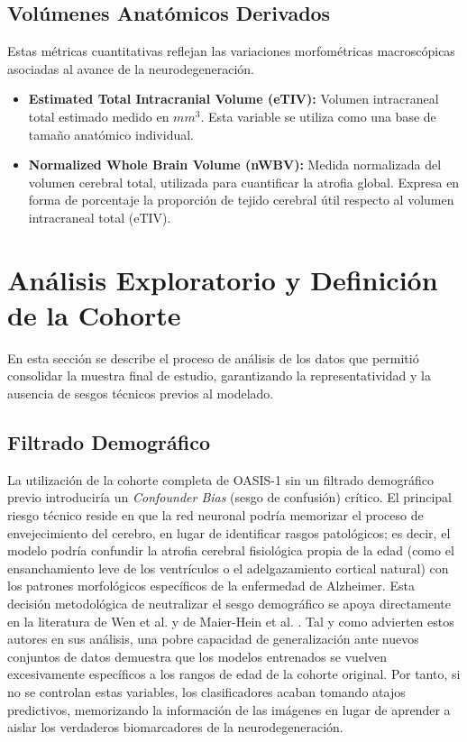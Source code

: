 \documentclass[12pt, oneside, english, spanish]{book}
\begin{document}
\subsection{Volúmenes Anatómicos Derivados} \label{subsec:volumenes_anatomicos}
Estas métricas cuantitativas reflejan las variaciones morfométricas macroscópicas asociadas al avance de la neurodegeneración.
\begin{itemize}
	\item \textbf{Estimated Total Intracranial Volume (eTIV):} Volumen intracraneal total estimado medido en $mm^3$. Esta variable se utiliza como una base de tamaño anatómico individual.
	
	\item \textbf{Normalized Whole Brain Volume (nWBV):} Medida normalizada del volumen cerebral total, utilizada para cuantificar la atrofia global. Expresa en forma de porcentaje la proporción de tejido cerebral útil respecto al volumen intracraneal total (eTIV).
\end{itemize}

\section{Análisis Exploratorio y Definición de la Cohorte} \label{sec:eda}

En esta sección se describe el proceso de análisis de los datos que permitió consolidar la muestra final de estudio, garantizando la representatividad y la ausencia de sesgos técnicos previos al modelado.

\subsection{Filtrado Demográfico} \label{subsec:filtrado_demografico}

La utilización de la cohorte completa de OASIS-1 sin un filtrado demográfico previo introduciría un \textit{Confounder Bias} (sesgo de confusión) crítico. El principal riesgo técnico reside en que la red neuronal podría memorizar el proceso de envejecimiento del cerebro, en lugar de identificar rasgos patológicos; es decir, el modelo podría confundir la atrofia cerebral fisiológica propia de la edad (como el ensanchamiento leve de los ventrículos o el adelgazamiento cortical natural) con los patrones morfológicos específicos de la enfermedad de Alzheimer. Esta decisión metodológica de neutralizar el sesgo demográfico se apoya directamente en la literatura de Wen et al. \cite{wen2020convolutional} y de Maier-Hein et al. \cite{maierhein2020}. Tal y como advierten estos autores en sus análisis, una pobre capacidad de generalización ante nuevos conjuntos de datos demuestra que los modelos entrenados se vuelven excesivamente específicos a los rangos de edad de la cohorte original. Por tanto, si no se controlan estas variables, los clasificadores acaban tomando atajos predictivos, memorizando la información de las imágenes en lugar de aprender a aislar los verdaderos biomarcadores de la neurodegeneración.
\end{document}
